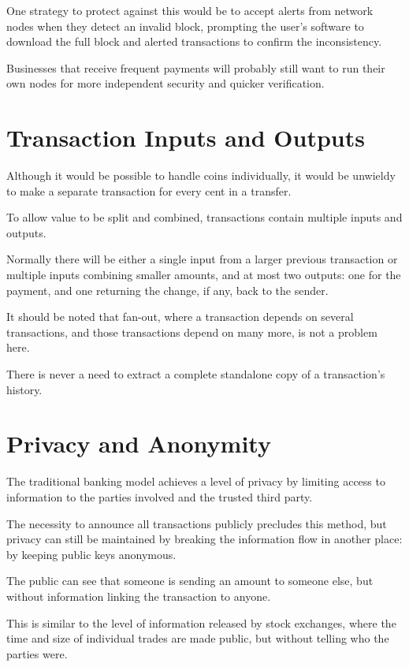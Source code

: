 \documentclass{article}
\begin{document}
One strategy to protect against this would be to accept alerts from network nodes when they detect an invalid block, prompting the user's software to download the full block and alerted transactions to confirm the inconsistency.

Businesses that receive frequent payments will probably still want to run their own nodes for more independent security and quicker verification.

\section{Transaction Inputs and Outputs}

Although it would be possible to handle coins individually, it would be unwieldy to make a separate transaction for every cent in a transfer.

To allow value to be split and combined, transactions contain multiple inputs and outputs.

Normally there will be either a single input from a larger previous transaction or multiple inputs combining smaller amounts, and at most two outputs: one for the payment, and one returning the change, if any, back to the sender.

It should be noted that fan-out, where a transaction depends on several transactions, and those transactions depend on many more, is not a problem here.

There is never a need to extract a complete standalone copy of a transaction's history.

\section{Privacy and Anonymity}

The traditional banking model achieves a level of privacy by limiting access to information to the parties involved and the trusted third party.

The necessity to announce all transactions publicly precludes this method, but privacy can still be maintained by breaking the information flow in another place: by keeping public keys anonymous.

The public can see that someone is sending an amount to someone else, but without information linking the transaction to anyone.

This is similar to the level of information released by stock exchanges, where the time and size of individual trades are made public, but without telling who the parties were.
\end{document}
